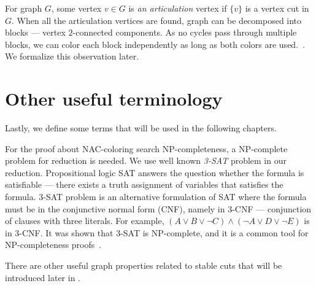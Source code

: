 For graph \( G \), some vertex \( v \in G \) is \emph{an articulation} vertex if
\( \{v\} \) is a vertex cut in \( G \).
When all the articulation vertices are found,
graph can be decomposed into blocks
--- vertex \( 2 \)-connected components.
As no cycles pass through multiple blocks, we can color each block
independently as long as both colors are used.~\cite{my_paper}.
We formalize this observation later.

\section{Other useful terminology}

Lastly, we define some terms that will be used in the following chapters.

For the proof about NAC-coloring search NP-completeness,
a NP-complete problem for reduction is needed.
We use well known \emph{3-SAT} problem in our reduction.
Propositional logic SAT answers the question
whether the formula is satisfiable ---
there exists a truth assignment of variables that satisfies the formula.
3-SAT problem is an alternative formulation of SAT
where the formula must be in the conjunctive normal form (CNF), namely in 3-CNF
--- conjunction of clauses with three literals.
For example, \( (A \lor B \lor \lnot C) \land (\lnot A \lor D \lor \lnot E) \)
is in 3-CNF\@.
It was shown that 3-SAT is NP-complete,
and it is a common tool for NP-completeness proofs~\cite{3-sat}.

There are other useful graph properties related to stable cuts
that will be introduced later in .
